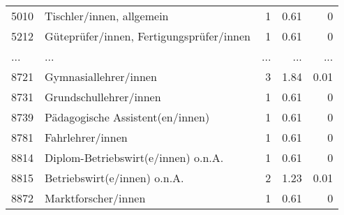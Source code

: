\begin{longtable}{lXrrr}
        5010 & \multicolumn{1}{X}{Tischler/innen, allgemein} & %
          \num{1} &
          \num[round-mode=places,round-precision=2]{0,61} &
          \num[round-mode=places,round-precision=2]{0} \\
        5212 & \multicolumn{1}{X}{Güteprüfer/innen, Fertigungsprüfer/innen} & %
          \num{1} &
          \num[round-mode=places,round-precision=2]{0,61} &
          \num[round-mode=places,round-precision=2]{0} \\
       ... & ... & ... & ... & ... \\
        8721 & \multicolumn{1}{X}{Gymnasiallehrer/innen} & %
          \num{3} &
          \num[round-mode=places,round-precision=2]{1,84} &
          \num[round-mode=places,round-precision=2]{0,01} \\

        8731 & \multicolumn{1}{X}{Grundschullehrer/innen} & %
          \num{1} &
          \num[round-mode=places,round-precision=2]{0,61} &
          \num[round-mode=places,round-precision=2]{0} \\

        8739 & \multicolumn{1}{X}{Pädagogische Assistent(en/innen)} & %
          \num{1} &
          \num[round-mode=places,round-precision=2]{0,61} &
          \num[round-mode=places,round-precision=2]{0} \\

        8781 & \multicolumn{1}{X}{Fahrlehrer/innen} & %
          \num{1} &
          \num[round-mode=places,round-precision=2]{0,61} &
          \num[round-mode=places,round-precision=2]{0} \\

        8814 & \multicolumn{1}{X}{Diplom-Betriebswirt(e/innen) o.n.A.} & %
          \num{1} &
          \num[round-mode=places,round-precision=2]{0,61} &
          \num[round-mode=places,round-precision=2]{0} \\

        8815 & \multicolumn{1}{X}{Betriebswirt(e/innen) o.n.A.} & %
          \num{2} &
          \num[round-mode=places,round-precision=2]{1,23} &
          \num[round-mode=places,round-precision=2]{0,01} \\

        8872 & \multicolumn{1}{X}{Marktforscher/innen} & %
          \num{1} &
          \num[round-mode=places,round-precision=2]{0,61} &
          \num[round-mode=places,round-precision=2]{0} \\


\end{longtable}
